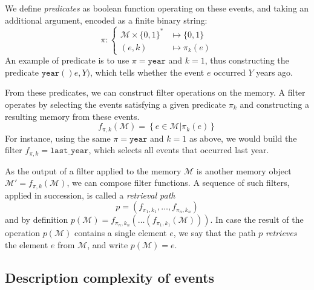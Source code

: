 \documentclass[conference]{IEEEtran}
\begin{document}
We define \emph{predicates} as boolean function operating on these events, and
taking an additional argument, encoded as a finite binary string:
\begin{equation}
  \label{eq:predicate}
  \pi : \begin{cases}
    \mathcal{M}\times \{0,1\}^{*} &\mapsto \{0,1\} \\
    (e, k) &\mapsto \pi_{k}(e)
    \end{cases}
\end{equation}
An example of predicate is to use $\pi = \mathtt{year}$ and $k=1$, thus
constructing the predicate $\mathtt{year()}e, Y\mathtt{)}$, which tells whether
the event $e$ occurred $Y$ years ago.

From these predicates, we can construct filter operations on the memory. A
filter operates by selecting the events satisfying a given predicate
$\pi_{k}$ and constructing a resulting memory from these events.
\begin{equation}
  \label{eq:filter}
 f_{\pi, k}(\mathcal{M}) = \left\{e \in \mathcal{M} | \pi_{k}(e) \right\}
\end{equation}
For instance, using the same $\pi = \mathtt{year}$ and $k=1$ as above, we would
build the filter $f_{\pi, k} = \mathtt{last\_{}year}$, which selects all events
that occurred last year.

As the output of a filter applied to the memory $\mathcal{M}$ is another memory
object $\mathcal{M'} = f_{\pi, k}(\mathcal{M})$, we can compose filter
functions. A sequence of such filters, applied in succession, is called a
\emph{retrieval path}
\begin{equation}
\label{eq:ret_def}
p = (f_{\pi_{1}, k_{1}}, \dots, f_{\pi_{n}, k_{n}})
\end{equation}
and by definition
$p(\mathcal{M}) = f_{\pi_{n}, k_{n}}(\dots(f_{\pi_{1}, k_{1}}(\mathcal{M})))$.
In case the result of the operation $p(\mathcal{M})$ contains a single element
$e$, we say that the path $p$ \emph{retrieves} the element $e$ from $\mathcal{M}$, and write
$p(\mathcal{M}) = e$.

\subsection{Description complexity of events}

\end{document}
